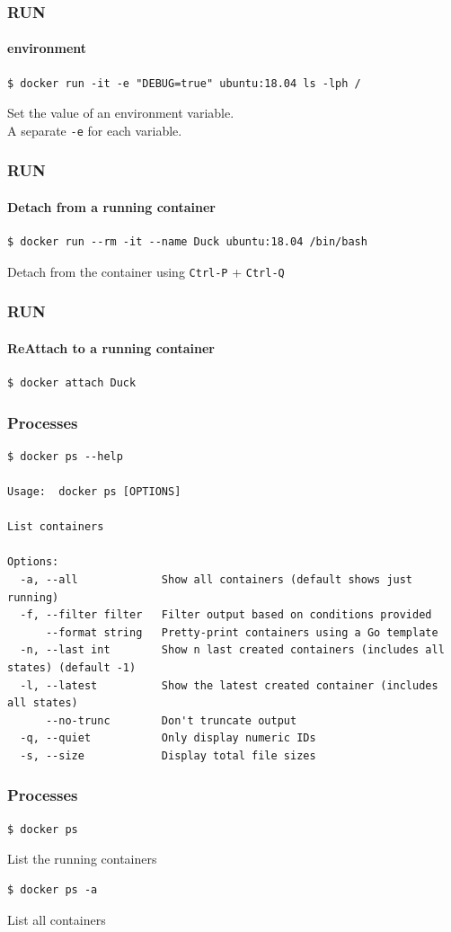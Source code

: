 \begin{frame}[fragile]
\frametitle{RUN}
\framesubtitle{environment}
\begin{lstlisting}
$ docker run -it -e "DEBUG=true" ubuntu:18.04 ls -lph /
\end{lstlisting}
Set the value of an environment variable.\\
\vspace{0.4cm}
A separate \lstinline!-e! for each variable.
\end{frame}

\begin{frame}[fragile]
\frametitle{RUN}
\framesubtitle{Detach from a running container}
\begin{lstlisting}
$ docker run --rm -it --name Duck ubuntu:18.04 /bin/bash
\end{lstlisting}
Detach from the container using \lstinline!Ctrl-P! + \lstinline!Ctrl-Q!
\end{frame}

\begin{frame}[fragile]
\frametitle{RUN}
\framesubtitle{ReAttach to a running container}
\begin{lstlisting}
$ docker attach Duck
\end{lstlisting}
\end{frame}

\begin{frame}[fragile]
\frametitle{Processes}
\scriptsize
\begin{lstlisting}[breaklines=true]
$ docker ps --help

Usage:  docker ps [OPTIONS]

List containers

Options:
  -a, --all             Show all containers (default shows just running)
  -f, --filter filter   Filter output based on conditions provided
      --format string   Pretty-print containers using a Go template
  -n, --last int        Show n last created containers (includes all states) (default -1)
  -l, --latest          Show the latest created container (includes all states)
      --no-trunc        Don't truncate output
  -q, --quiet           Only display numeric IDs
  -s, --size            Display total file sizes
\end{lstlisting}
\normalsize
\end{frame}

\begin{frame}[fragile]
\frametitle{Processes}
\begin{lstlisting}
$ docker ps
\end{lstlisting}
List the running containers 
\begin{lstlisting}
$ docker ps -a
\end{lstlisting}
List all containers 
\end{frame}


